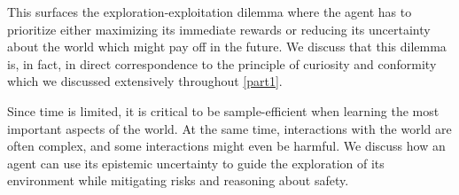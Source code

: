 This surfaces the exploration-exploitation dilemma where the agent has to prioritize either maximizing its immediate rewards or reducing its uncertainty about the world which might pay off in the future.
We discuss that this dilemma is, in fact, in direct correspondence to the principle of curiosity and conformity which we discussed extensively throughout \cref{part1}.

Since time is limited, it is critical to be sample-efficient when learning the most important aspects of the world.
At the same time, interactions with the world are often complex, and some interactions might even be harmful.
We discuss how an agent can use its epistemic uncertainty to guide the exploration of its environment while mitigating risks and reasoning about safety.
